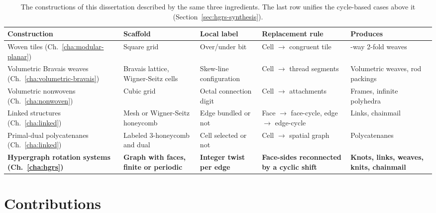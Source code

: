\begin{table}[htbp]
\centering
\begin{singlespace}
\footnotesize
\begin{tabular}{@{}>{\raggedright\arraybackslash}p{}>{\raggedright\arraybackslash}p{}>{\raggedright\arraybackslash}p{}>{\raggedright\arraybackslash}p{}>{\raggedright\arraybackslash}p{}@{}}
\toprule
\textbf{Construction} & \textbf{Scaffold} & \textbf{Local label} & \textbf{Replacement rule} & \textbf{Produces} \\
\midrule
Woven tiles (Ch.~\ref{cha:modular-planar}) & Square grid & Over/under bit & Cell $\to$ congruent tile & 2-way 2-fold weaves \\[3pt]
Volumetric Bravais weaves (Ch.~\ref{cha:volumetric-bravais}) & Bravais lattice, Wigner-Seitz cells & Skew-line configuration & Cell $\to$ thread segments & Volumetric weaves, rod packings \\[3pt]
Volumetric nonwovens (Ch.~\ref{cha:nonwoven}) & Cubic grid & Octal connection digit & Cell $\to$ attachments & Frames, infinite polyhedra \\[3pt]
Linked structures (Ch.~\ref{cha:linked}) & Mesh or Wigner-Seitz honeycomb & Edge bundled or not & Face $\to$ face-cycle, edge $\to$ edge-cycle & Links, chainmail \\[3pt]
Primal-dual polycatenanes (Ch.~\ref{cha:linked}) & Labeled 3-honeycomb and dual & Cell selected or not & Cell $\to$ spatial graph & Polycatenanes \\[3pt]
\textbf{Hypergraph rotation systems (Ch.~\ref{cha:hgrs})} & \textbf{Graph with faces, finite or periodic} & \textbf{Integer twist per edge} & \textbf{Face-sides reconnected by a cyclic shift} & \textbf{Knots, links, weaves, knits, chainmail} \\
\bottomrule
\end{tabular}
\end{singlespace}
\caption[Constructions of this dissertation as scaffold, label, and rule.]{The constructions of this dissertation described by the same three ingredients. The last row unifies the cycle-based cases above it (Section~\ref{sec:hgrs-synthesis}).}
\label{tab:scheme}
\end{table}

\section{Contributions}
\label{sec:contributions}

